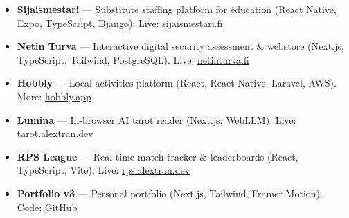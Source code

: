 
\begin{itemize}[leftmargin=*]
  \item \textbf{Sijaismestari} — Substitute staffing platform for education (React Native, Expo, TypeScript, Django). Live: \href{https://www.sijaismestari.fi/}{sijaismestari.fi}
  \item \textbf{Netin Turva} — Interactive digital security assessment & webstore (Next.js, TypeScript, Tailwind, PostgreSQL). Live: \href{https://www.netinturva.fi/}{netinturva.fi}
  \item \textbf{Hobbly} — Local activities platform (React, React Native, Laravel, AWS). More: \href{https://hobbly.app}{hobbly.app}
  \item \textbf{Lumina} — In-browser AI tarot reader (Next.js, WebLLM). Live: \href{https://tarot.alextran.dev/}{tarot.alextran.dev}
  \item \textbf{RPS League} — Real-time match tracker & leaderboards (React, TypeScript, Vite). Live: \href{https://rps.alextran.dev}{rps.alextran.dev}
  \item \textbf{Portfolio v3} — Personal portfolio (Next.js, Tailwind, Framer Motion). Code: \href{https://github.com/alextrandev/portfolio_v3}{GitHub}
\end{itemize}
